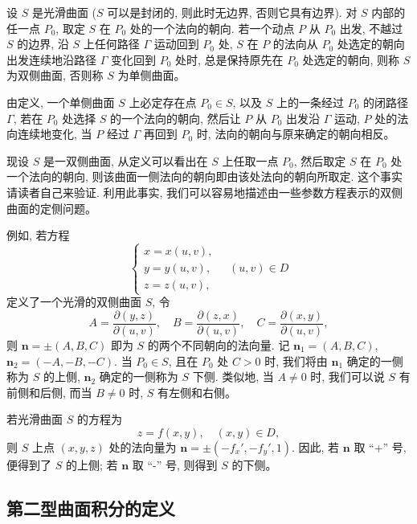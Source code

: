 \documentclass[12pt,fontset=fandol]{ctexart}
\begin{document}
\begin{definition}\label{course-definition-16-4-1}\quad 设 $S$ 是光滑曲面 ($S$ 可以是封闭的, 则此时无边界, 否则它具有边界). 对 $S$ 内部的任一点 $P_0$, 取定 $S$ 在 $P_0$ 处的一个法向的朝向. 若一个动点 $P$ 从 $P_0$ 出发, 不越过 $S$ 的边界, 沿 $S$ 上任何路径 $\Gamma$ 运动回到 $P_0$ 处, $S$ 在 $P$ 的法向从 $P_0$ 处选定的朝向出发连续地沿路径 $\Gamma$ 变化回到 $P_0$ 处时, 总是保持原先在 $P_0$ 处选定的朝向, 则称 $S$ 为双侧曲面, 否则称 $S$ 为单侧曲面。

由定义, 一个单侧曲面 $S$ 上必定存在点 $P_0\in S$, 以及 $S$ 上的一条经过 $P_0$ 的闭路径 $\Gamma$, 若在 $P_0$ 处选择 $S$ 的一个法向的朝向, 然后让 $P$ 从 $P_0$ 出发沿 $\Gamma$ 运动, $P$ 处的法向连续地变化, 当 $P$ 经过 $\Gamma$ 再回到 $P_0$ 时, 法向的朝向与原来确定的朝向相反。

现设 $S$ 是一双侧曲面, 从定义可以看出在 $S$ 上任取一点 $P_0$, 然后取定 $S$ 在 $P_0$ 处一个法向的朝向, 则该曲面一侧法向的朝向即由该处法向的朝向所取定. 这个事实请读者自己来验证. 利用此事实, 我们可以容易地描述由一些参数方程表示的双侧曲面的定侧问题。

例如, 若方程
\[
  \begin{cases}
    x=x(u,v),\\
    y=y(u,v),\\
    z=z(u,v),
  \end{cases}\quad (u,v)\in D
\]
定义了一个光滑的双侧曲面 $S$, 令
\begin{equation}
  A=\frac{\partial(y,z)}{\partial(u,v)},\quad
  B=\frac{\partial(z,x)}{\partial(u,v)},\quad
  C=\frac{\partial(x,y)}{\partial(u,v)},
  \label{course-eq-16-4-1}
\end{equation}
则 $\boldsymbol n=\pm(A,B,C)$ 即为 $S$ 的两个不同朝向的法向量. 记 $\boldsymbol n_1=(A,B,C)$, $\boldsymbol n_2=(-A,-B,-C)$. 当 $P_0\in S$, 且在 $P_0$ 处 $C>0$ 时, 我们将由 $\boldsymbol n_1$ 确定的一侧称为 $S$ 的上侧, $\boldsymbol n_2$ 确定的一侧称为 $S$ 下侧. 类似地, 当 $A\ne0$ 时, 我们可以说 $S$ 有前侧和后侧, 而当 $B\ne0$ 时, $S$ 有左侧和右侧。

若光滑曲面 $S$ 的方程为
\[
  z=f(x,y),\quad (x,y)\in D,
\]
则 $S$ 上点 $(x,y,z)$ 处的法向量为 $\boldsymbol n=\pm(-f_x',-f_y',1)$. 因此, 若 $\boldsymbol n$ 取 ``+'' 号, 便得到了 $S$ 的上侧; 若 $\boldsymbol n$ 取 ``-'' 号, 则得到 $S$ 的下侧。

\end{definition}
\subsection{第二型曲面积分的定义}
\end{document}

